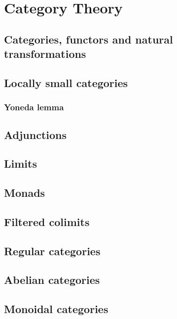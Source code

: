 \documentclass[main.tex]{subfiles}
\begin{document}
	\chapter{Category Theory}
	\section{Categories, functors and natural transformations}
	
	\section{Locally small categories}
	\subsection{Yoneda lemma}
	
	\section{Adjunctions}
	
	\section{Limits}
	
	\section{Monads}
	
	\section{Filtered colimits}
	
	\section{Regular categories}
	
	\section{Abelian categories}
	
	\section{Monoidal categories}
\end{document}
